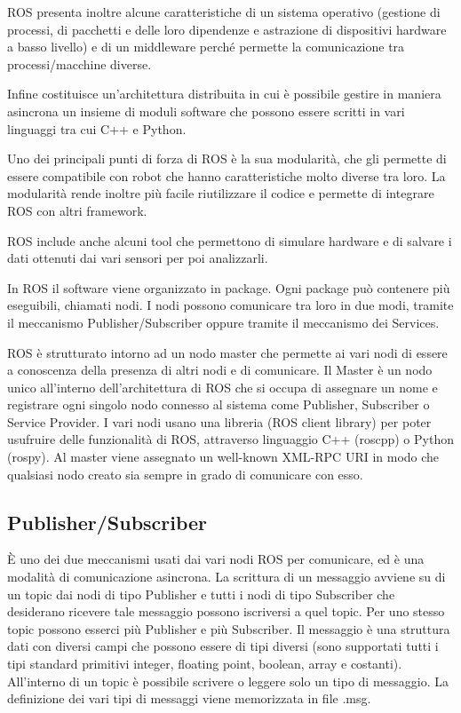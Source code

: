 \documentclass[Lau, binding=0.6cm, oneside]{sapthesis}
\begin{document}
ROS presenta inoltre alcune caratteristiche di un sistema operativo (gestione di processi, di pacchetti e delle loro dipendenze e astrazione di dispositivi hardware a basso livello) e di un middleware perché permette la comunicazione tra processi/macchine diverse.

Infine costituisce un’architettura distribuita in cui è possibile gestire in maniera asincrona un insieme di moduli software che possono essere scritti in vari linguaggi tra cui C++ e Python.

Uno dei principali punti di forza di ROS è la sua modularità, che gli permette di essere compatibile con robot che hanno caratteristiche molto diverse tra loro.
La modularità rende inoltre più facile riutilizzare il codice e permette di integrare ROS con altri framework.

ROS include anche alcuni tool che permettono di simulare hardware e di salvare i dati ottenuti dai vari sensori per poi analizzarli.

In ROS il software viene organizzato in package. Ogni package può contenere più eseguibili, chiamati nodi.
I nodi possono comunicare tra loro in due modi, tramite il meccanismo Publisher/Subscriber oppure tramite il meccanismo dei Services.

ROS è strutturato intorno ad un nodo master che permette ai vari nodi di essere a conoscenza della presenza di altri nodi e di comunicare.
Il Master è un nodo unico all’interno dell’architettura di ROS che si occupa di assegnare un nome e registrare ogni singolo nodo connesso al sistema come Publisher, Subscriber o Service Provider.
I vari nodi usano una libreria (ROS client library) per poter usufruire delle funzionalità di ROS, attraverso linguaggio C++ (roscpp) o Python (rospy).
Al master viene assegnato un well-known XML-RPC URI in modo che qualsiasi nodo creato sia sempre in grado di comunicare con esso.\cite{fonte3}

\subsection{Publisher/Subscriber}
È uno dei due meccanismi usati dai vari nodi ROS per comunicare, ed è una modalità di comunicazione asincrona.
La scrittura di un messaggio avviene su di un topic dai nodi di tipo Publisher e tutti i nodi di tipo Subscriber che desiderano ricevere tale messaggio possono iscriversi a quel topic.
Per uno stesso topic possono esserci più Publisher e più Subscriber.
Il messaggio è una struttura dati con diversi campi che possono essere di tipi diversi (sono supportati tutti i tipi standard primitivi integer, floating point, boolean, array e costanti).
All’interno di un topic è possibile scrivere o leggere solo un tipo di messaggio.
La definizione dei vari tipi di messaggi viene memorizzata in file .msg.
\end{document}
